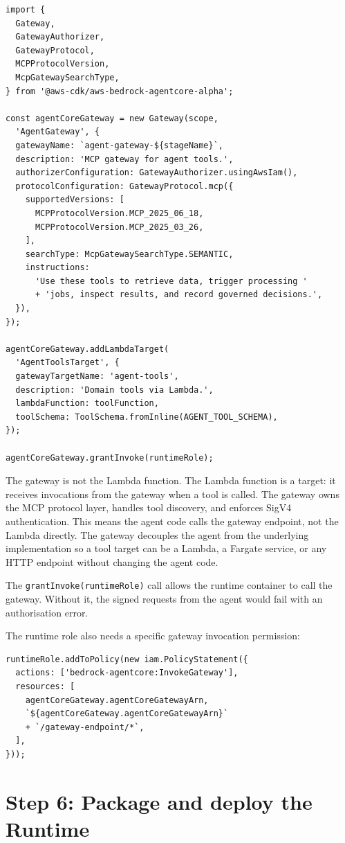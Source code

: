 \begin{lstlisting}
import {
  Gateway,
  GatewayAuthorizer,
  GatewayProtocol,
  MCPProtocolVersion,
  McpGatewaySearchType,
} from '@aws-cdk/aws-bedrock-agentcore-alpha';

const agentCoreGateway = new Gateway(scope,
  'AgentGateway', {
  gatewayName: `agent-gateway-${stageName}`,
  description: 'MCP gateway for agent tools.',
  authorizerConfiguration: GatewayAuthorizer.usingAwsIam(),
  protocolConfiguration: GatewayProtocol.mcp({
    supportedVersions: [
      MCPProtocolVersion.MCP_2025_06_18,
      MCPProtocolVersion.MCP_2025_03_26,
    ],
    searchType: McpGatewaySearchType.SEMANTIC,
    instructions:
      'Use these tools to retrieve data, trigger processing '
      + 'jobs, inspect results, and record governed decisions.',
  }),
});

agentCoreGateway.addLambdaTarget(
  'AgentToolsTarget', {
  gatewayTargetName: 'agent-tools',
  description: 'Domain tools via Lambda.',
  lambdaFunction: toolFunction,
  toolSchema: ToolSchema.fromInline(AGENT_TOOL_SCHEMA),
});

agentCoreGateway.grantInvoke(runtimeRole);
\end{lstlisting}

The gateway is not the Lambda function. The Lambda function is a target: it receives
invocations from the gateway when a tool is called. The gateway owns the MCP protocol
layer, handles tool discovery, and enforces SigV4 authentication. This means the agent
code calls the gateway endpoint, not the Lambda directly. The gateway decouples the agent
from the underlying implementation so a tool target can be a Lambda, a Fargate service,
or any HTTP endpoint without changing the agent code.

The \texttt{grantInvoke(runtimeRole)} call allows the runtime container to call the
gateway. Without it, the signed requests from the agent would fail with an authorisation
error.

The runtime role also needs a specific gateway invocation permission:

\begin{lstlisting}
runtimeRole.addToPolicy(new iam.PolicyStatement({
  actions: ['bedrock-agentcore:InvokeGateway'],
  resources: [
    agentCoreGateway.agentCoreGatewayArn,
    `${agentCoreGateway.agentCoreGatewayArn}`
    + `/gateway-endpoint/*`,
  ],
}));
\end{lstlisting}

\section{Step 6: Package and deploy the Runtime}

